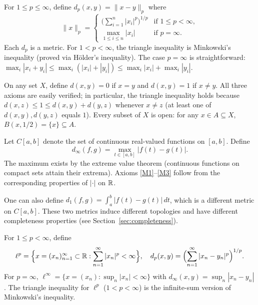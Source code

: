 \documentclass[11pt,a4paper]{article}
\begin{document}
\begin{example}[$p$-Metrics on $\R^n$]
\label{ex:p_metric}
For $1 \le p \le \infty$, define $d_p(x,y) = \|x - y\|_p$ where
\[
\|x\|_p =
\begin{cases}
\bigl(\sum_{i=1}^n |x_i|^p\bigr)^{1/p} & \text{if } 1 \le p < \infty,\\[4pt]
\max_{1 \le i \le n} |x_i| & \text{if } p = \infty.
\end{cases}
\]
Each $d_p$ is a metric. For $1 < p < \infty$, the triangle inequality is
Minkowski's inequality (proved via H\"older's inequality). The case
$p = \infty$ is straightforward:
$\max_i |x_i + y_i| \le \max_i(|x_i| + |y_i|) \le \max_i|x_i| + \max_i|y_i|$.
\end{example}

\begin{example}
\label{ex:discrete}
On any set $X$, define $d(x,y) = 0$ if $x = y$ and $d(x,y) = 1$ if $x \ne y$.
All three axioms are easily verified; in particular, the triangle inequality
holds because $d(x,z) \le 1 \le d(x,y) + d(y,z)$ whenever $x \ne z$ (at least
one of $d(x,y), d(y,z)$ equals $1$). Every subset of $X$ is open: for any
$x \in A \subseteq X$, $B(x, 1/2) = \{x\} \subseteq A$.
\end{example}

\begin{example}
\label{ex:Cab}
Let $C[a,b]$ denote the set of continuous real-valued functions on $[a,b]$.
Define
\[
d_\infty(f,g) = \max_{t \in [a,b]} |f(t) - g(t)|.
\]
The maximum exists by the extreme value theorem (continuous functions on
compact sets attain their extrema). Axioms \ref{M1}--\ref{M3} follow from
the corresponding properties of $|\cdot|$ on $\mathbb{R}$.

One can also define $d_1(f,g) = \int_a^b |f(t) - g(t)|\, dt$, which is a
different metric on $C[a,b]$. These two metrics induce different topologies
and have different completeness properties (see Section~\ref{sec:completeness}).
\end{example}

\begin{example}
\label{ex:ell_p}
For $1 \le p < \infty$, define
\[
\ell^p = \Bigl\{x = (x_n)_{n=1}^\infty \subset \mathbb{R} :
  \sum_{n=1}^\infty |x_n|^p < \infty\Bigr\}, \quad
d_p(x,y) = \Bigl(\sum_{n=1}^\infty |x_n - y_n|^p\Bigr)^{1/p}.
\]
For $p = \infty$,
$\ell^\infty = \{x = (x_n) : \sup_n |x_n| < \infty\}$ with
$d_\infty(x,y) = \sup_n |x_n - y_n|$.
The triangle inequality for $\ell^p$ ($1 < p < \infty$) is the infinite-sum
version of Minkowski's inequality.
\end{example}
\end{document}
